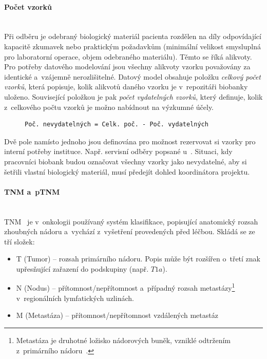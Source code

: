 \documentclass[11pt, draft, oneside]{fithesis2}
\newcommand{\paragraphNewLine}[1]{\paragraph*{#1}\mbox{}\\}
\begin{document}
\paragraphNewLine{Počet vzorků}
Při odběru je odebraný biologický materiál pacienta rozdělen na díly odpovídající kapacitě zkumavek nebo praktickým požadavkům (minimální velikost smysluplná pro laboratorní operace, objem odebraného materiálu). Těmto  se říká alikvoty. Pro potřeby datového modelování jsou všechny alikvoty vzorku považovány za identické a~vzájemně nerozlišitelné. 
Datový model obsahuje položku \textit{celkový počet vzorků}, která popisuje, kolik alikvotů daného vzorku je v~repozitáři biobanky uloženo. Související položkou je pak \textit{počet vydatelných vzorků}, který definuje, kolik z~celkového počtu vzorků je možno nabídnout na výzkumné účely.
\begin{figure}[h!] %
\centering
\begin{BVerbatim}
Poč. nevydatelných = Celk. poč. - Poč. vydatelných
\end{BVerbatim}
\end{figure}
Dvě pole namísto jednoho jsou definována pro možnost rezervovat si vzorky pro interní potřeby instituce. Např. servisní odběry popsané u~.
Situaci, kdy pracovníci biobank budou označovat všechny vzorky jako nevydatelné, aby si šetřili vlastní biologický materiál, musí předejít dohled koordinátora projektu. 

\paragraphNewLine{TNM a~pTNM}
TNM~\cite{TNM} je v~onkologii používaný systém klasifikace, popisující anatomický rozsah zhoubných nádoru a~vychází z~vyšetření provedených před léčbou. 
Skládá se ze tří složek:
\begin{itemize}
	\item T (Tumor) -- rozsah primárního nádoru. Popis může být rozšířen o~třetí znak upřesňující zařazení do podskupiny (např. $T1a$).
	
	\item N (Nodus) -- přítomnost/nepřítomnost a~případný rozsah metastázy\footnote{Metastáza je druhotné ložisko nádorových buněk, vzniklé odtržením z~primárního nádoru~\cite{metastaza}.} v~regionálních lymfatických uzlinách.
	\item M (Metastáza) -- přítomnost/nepřítomnost vzdálených metastáz
\end{itemize}
\end{document}
